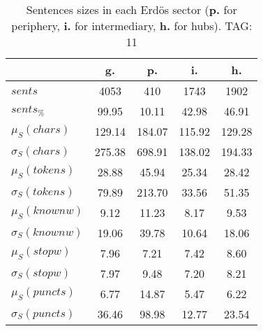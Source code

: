 \begin{table}[h!]
\begin{center}
\begin{tabular}{| l | c | c | c | c |}\hline
 & g. & p. & i. & h. \\\hline
$sents$ & 4053  & 410  & 1743  & 1902 \\\hline
$sents_{\%}$ & 99.95  & 10.11  & 42.98  & 46.91 \\\hline
$\mu_S(chars)$ & 129.14  & 184.07  & 115.92  & 129.28 \\\hline
$\sigma_S(chars)$ & 275.38  & 698.91  & 138.02  & 194.33 \\\hline
$\mu_S(tokens)$ & 28.88  & 45.94  & 25.34  & 28.42 \\\hline
$\sigma_S(tokens)$ & 79.89  & 213.70  & 33.56  & 51.35 \\\hline
$\mu_S(knownw)$ & 9.12  & 11.23  & 8.17  & 9.53 \\\hline
$\sigma_S(knownw)$ & 19.06  & 39.78  & 10.64  & 18.06 \\\hline
$\mu_S(stopw)$ & 7.96  & 7.21  & 7.42  & 8.60 \\\hline
$\sigma_S(stopw)$ & 7.97  & 9.48  & 7.20  & 8.21 \\\hline
$\mu_S(puncts)$ & 6.77  & 14.87  & 5.47  & 6.22 \\\hline
$\sigma_S(puncts)$ & 36.46  & 98.98  & 12.77  & 23.54 \\\hline
\end{tabular}
\caption{Sentences sizes in each Erd\"os sector ({{\bf p.}} for periphery, {{\bf i.}} for intermediary, {{\bf h.}} for hubs). TAG: 11}
\end{center}
\end{table}